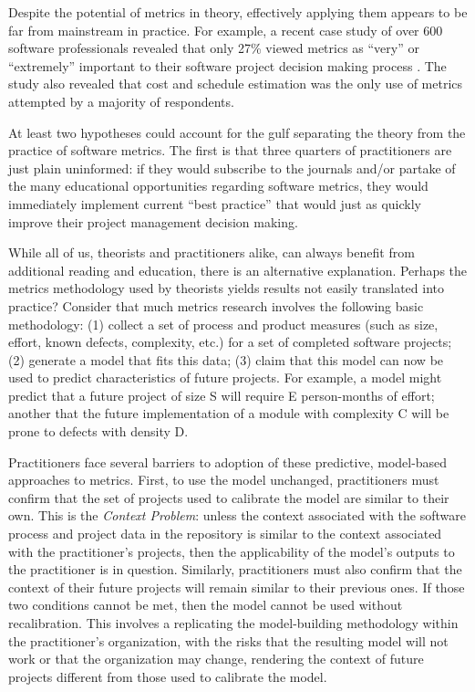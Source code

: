 \documentclass[11pt,twocolumn]{article}
\begin{document}
Despite the potential of metrics in theory, effectively applying them
appears to be far from mainstream in practice. For example, a recent case
study of over 600 software professionals revealed that only 27\% viewed
metrics as ``very'' or ``extremely'' important to their software project
decision making process \cite{Kulik2003}. The study also revealed that cost
and schedule estimation was the only use of metrics attempted
by a majority of respondents.

At least two hypotheses could account for the gulf separating the theory
from the practice of software metrics. The first is that three quarters of
practitioners are just plain uninformed: if they would subscribe to the
journals and/or partake of the many educational opportunities regarding
software metrics, they would immediately implement current ``best
practice'' that would just as quickly improve their project management
decision making.

While all of us, theorists and practitioners alike, can always benefit from
additional reading and education, there is an alternative explanation.
Perhaps the metrics methodology used by theorists yields results not easily
translated into practice?  Consider that much metrics research involves the
following basic methodology: (1) collect a set of process and product
measures (such as size, effort, known defects, complexity, etc.) for a set
of completed software projects; (2) generate a model that fits this data;
(3) claim that this model can now be used to predict characteristics of
future projects. For example, a model might predict that a future project
of size S will require E person-months of effort; another that the future
implementation of a module with complexity C will be prone to defects with
density D. 

Practitioners face several barriers to adoption of these predictive,
model-based approaches to metrics.  First, to use the model unchanged,
practitioners must confirm that the set of projects used to calibrate the
model are similar to their own.  This is the {\em Context Problem}: unless
the context associated with the software process and project data in the
repository is similar to the context associated with the practitioner's
projects, then the applicability of the model's outputs to the practitioner
is in question.  Similarly, practitioners must also confirm that the
context of their future projects will remain similar to their previous
ones.  If those two conditions cannot be met, then the model cannot be used
without recalibration.  This involves a replicating the model-building
methodology within the practitioner's organization, with the risks that the
resulting model will not work or that the organization may change,
rendering the context of future projects different from those used to
calibrate the model.
\end{document}
